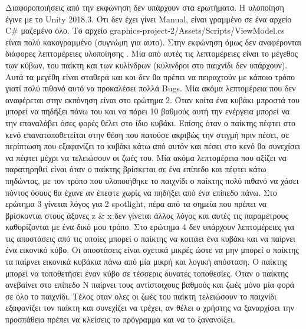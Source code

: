 \documentclass{article}
\begin{document}
Διαφοροποιήσεις από την εκφώνηση δεν υπάρχουν στα ερωτήματα.
Η υλοποίηση έγινε με το
Unity 2018.3.
Ότι δεν έχει γίνει
Manual,
 είναι γραμμένο σε ένα αρχείο
 C\#
 μαζεμένο όλο. Το αρχείο
 graphics-project-2/Assets/Scripts/ViewModel.cs
 είναι πολύ κακογραμμένο (συγνώμη για αυτο).
 Στην εκφώνηση όμως δεν αναφέρονται διάφορες λεπτομέρειες υλοποίησης
. Μία από αυτές τις λεπτομέρειες είναι το μέγεθος των κύβων,
 του παίκτη και των κυλίνδρων (κύλινδροι στο παιχνίδι δεν υπάρχουν). Αυτά
 τα μεγέθη είναι σταθερά και και δεν θα πρέπει να πειραχτούν με κάποιο
 τρόπο γιατί πολύ πιθανό αυτό να προκαλέσει πολλά
Bugs.
 Μία ακόμα λεπτομέρεια
 που δεν αναφέρεται στην εκπόνηση είναι στο ερώτημα 2. Όταν κοίτα ένα
 κυβάκι μπροστά του μπορεί να πηδήξει πάνω του και να πάρει 10 βαθμούς
 αυτή την ενέργεια μπορεί να την επαναλάβει όσες φορές θέλει στο ίδιο
 κυβάκι. Επίσης όταν ο παίκτης πέφτει στο κενό επανατοποθετείται στην
 θέση που πατούσε ακριβώς την στιγμή πριν πέσει, σε περίπτωση που
 εξαφανίζει το κυβάκι κάτω από αυτόν και πέσει στο κενό θα συνεχίσει να
 πέφτει μέχρι να τελειώσουν οι ζωές του. Μία ακόμα λεπτομέρεια που αξίζει
 να παρατηρηθεί είναι όταν ο παίκτης βρίσκεται σε ένα επίπεδο και πέφτει
 κάτω πηδώντας, με τον τρόπο που υλοποιήθηκε το παιχνίδι ο παίκτης πολύ
 πιθανό να χάσει πόντος όσους θα έχανε αν έπεφτε χωρίς να πηδήξει από ένα
 επίπεδο πάνω. Στο ερώτημα 3 γίνεται λόγος για 2
 spotlight,
 πέρα από τα
 σημεία που πρέπει να βρίσκονται στους άξονες
 z \& x
 δεν γίνεται άλλος λόγος
 και αυτές τις παραμέτρους καθορίζονται με ένα δικό μου τρόπο. Στο ερώτημα
 4 δεν υπάρχουν λεπτομέρειες για τις αποστάσεις από τις οποίες μπορεί ο παίκτης
 να κοιτάει ένα κυβάκι και να παίρνει ένα εικονικό κύβο. Οι αποστάσεις είναι
 σχετικά μικρές ώστε να μην μπορεί ο παίκτης τα παίρνει εικονικά κυβάκια πάνω
 από μία μικρή και λογική απόσταση. Ο παίκτης μπορεί να τοποθετήσει έναν κύβο
 σε τέσσερις δυνατές τοποθεσίες. Όταν ο παίκτης ανεβαίνει στο επίπεδο
N
 παίρνει
 τους αντίστοιχους βαθμούς και ζωές μόνο μία φορά σε όλο το παιχνίδι. Τέλος οταν ολες οι ζωές του
 παίκτη τελειώσουν το παιχνίδι εξαφανίζει τον παίκτη και συνεχίζει να τρέχει, αν
 θέλει ο χρήστης να ξαναρχίσει την προσπάθεια πρέπει να κλείσεις το πρόγραμμα
 και να το ξανανοίξει.
\end{document}
